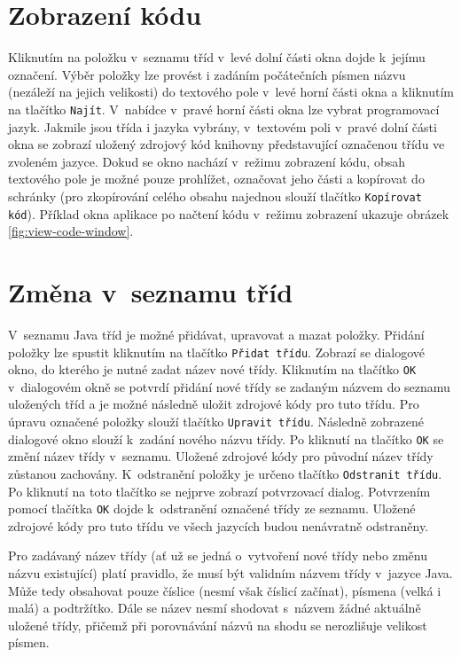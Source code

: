 \documentclass[czech,BP]{thesiskiv}
\begin{document}
\section{Zobrazení kódu}
Kliknutím na položku v~seznamu tříd v~levé dolní části okna dojde k~jejímu označení. Výběr položky lze provést i zadáním počátečních písmen názvu (nezáleží na jejich velikosti) do textového pole v~levé horní části okna a kliknutím na tlačítko \texttt{Najít}. V~nabídce v~pravé horní části okna lze vybrat programovací jazyk. Jakmile jsou třída i jazyka vybrány, v~textovém poli v~pravé dolní části okna se zobrazí uložený zdrojový kód knihovny představující označenou třídu ve zvoleném jazyce. Dokud se okno nachází v~režimu zobrazení kódu, obsah textového pole je možné pouze prohlížet, označovat jeho části a kopírovat do schránky (pro zkopírování celého obsahu najednou slouží tlačítko \texttt{Kopírovat kód}). Příklad okna aplikace po načtení kódu v~režimu zobrazení ukazuje obrázek \ref{fig:view-code-window}.

\section{Změna v~seznamu tříd}
V~seznamu Java tříd je možné přidávat, upravovat a mazat položky. Přidání položky lze spustit kliknutím na tlačítko \texttt{Přidat třídu}. Zobrazí se dialogové okno, do kterého je nutné zadat název nové třídy. Kliknutím na tlačítko \texttt{OK} v~dialogovém okně se potvrdí přidání nové třídy se zadaným názvem do seznamu uložených tříd a je možné následně uložit zdrojové kódy pro tuto třídu. Pro úpravu označené položky slouží tlačítko \texttt{Upravit třídu}. Následně zobrazené dialogové okno slouží k~zadání nového názvu třídy. Po kliknutí na tlačítko \texttt{OK} se změní název třídy v~seznamu. Uložené zdrojové kódy pro původní název třídy zůstanou zachovány. K~odstranění položky je určeno tlačítko \texttt{Odstranit třídu}. Po kliknutí na toto tlačítko se nejprve zobrazí potvrzovací dialog. Potvrzením pomocí tlačítka \texttt{OK} dojde k~odstranění označené třídy ze seznamu. Uložené zdrojové kódy pro tuto třídu ve všech jazycích budou nenávratně odstraněny.\par
Pro zadávaný název třídy (ať už se jedná o~vytvoření nové třídy nebo změnu názvu existující) platí pravidlo, že musí být validním názvem třídy v~jazyce Java. Může tedy obsahovat pouze číslice (nesmí však číslicí začínat), písmena (velká i malá) a podtržítko. Dále se název nesmí shodovat s~názvem žádné aktuálně uložené třídy, přičemž při porovnávání názvů na shodu se nerozlišuje velikost písmen.
\end{document}
